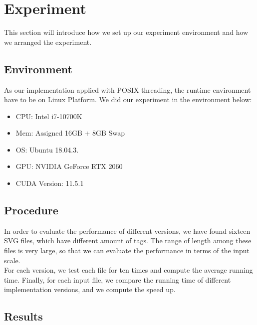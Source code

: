 \documentclass[10pt,twocolumn,letterpaper]{article}
\numberwithin{figure}{section}
\begin{document}
\section{Experiment}

This section will introduce how we set up our experiment environment and how we arranged the experiment.

\subsection{Environment}

As our implementation applied with POSIX threading, the runtime environment have to be on Linux Platform. We did our experiment in the environment below:

\begin{itemize}
\item CPU: Intel i7-10700K
\item Mem: Assigned 16GB $+$ 8GB Swap
\item OS: Ubuntu 18.04.3.
\item GPU: NVIDIA GeForce RTX 2060
\item CUDA Version: 11.5.1
\end{itemize}

\subsection{Procedure}
In order to evaluate the performance of different versions, we have found sixteen SVG files, which have different amount of tags. The range of length among these files is very large, so that we can evaluate the performance in terms of the input scale.\\
For each version, we test each file for ten times and compute the average running time. Finally, for each input file, we compare the running time of different implementation versions, and we compute the speed up.

\subsection{Results}
\end{document}
